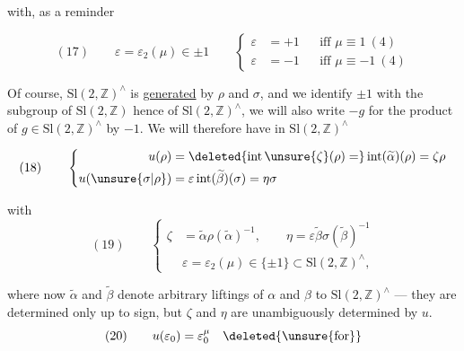 

with, as a reminder

\[
(17)\qquad
\varepsilon=\varepsilon_2(\mu)\in\pm1
\qquad
\left\{\begin{aligned}
\varepsilon&=+1&&\text{iff }\mu\equiv1\ (4)\\
\varepsilon&=-1&&\text{iff }\mu\equiv-1\ (4)
\end{aligned}\right.
\]

Of course, $\mathrm{Sl}(2,\mathbb Z)^\wedge$ is
\uline{generated}  by $\rho$ and $\sigma$,
and we identify $\pm1$ with the  subgroup
of $\mathrm{Sl}(2,\mathbb Z)$ hence of
$\mathrm{Sl}(2,\mathbb Z)^\wedge$, we will also write
$-g$ for the product of $g\in\mathrm{Sl}(2,\mathbb Z)^\wedge$
by $-1$. We will therefore have in $\mathrm{Sl}(2,\mathbb Z)^\wedge$

\[
(18)\qquad
\left\{\begin{aligned}
u(\rho)&=\deleted{\operatorname{int}\unsure{\zeta}(\rho)=}
\operatorname{int}(\widetilde{\alpha})(\rho)=\zeta\rho\\
u(\unsure{\sigma|\rho})&=
\varepsilon\operatorname{int}(\widetilde{\beta})(\sigma)=\eta\sigma
\end{aligned}\right.
\]

with
\[
(19)\qquad
\left\{\begin{aligned}
\zeta&=\widetilde{\alpha}\rho(\widetilde{\alpha})^{-1},\qquad
\eta=\varepsilon\widetilde{\beta}\sigma(\widetilde{\beta})^{-1}\\
&\varepsilon=\varepsilon_2(\mu)\in\{\pm1\}\subset
\mathrm{Sl}(2,\mathbb Z)^\wedge,
\end{aligned}\right.
\]



where now $\widetilde{\alpha}$ and $\widetilde{\beta}$
denote arbitrary liftings of $\alpha$ and $\beta$ to
$\mathrm{Sl}(2,\mathbb Z)^\wedge$ --- they are determined
only up to sign, but
$\zeta$ and $\eta$ are unambiguously determined by $u$.
\[
(20)\qquad u(\varepsilon_0)=\varepsilon_0^\mu
\quad\deleted{\text{\unsure{for}}}
\]


